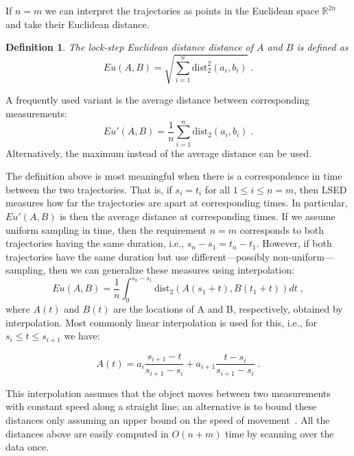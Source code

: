 \documentclass{interact}
\newcommand{\dist}{\ensuremath{\text{dist}}}
\newtheorem{definition}{Definition}
\begin{document}

If  $n=m$ we can interpret the trajectories as points in the Euclidean space $\mathbb{R}^{2n}$ and take their Euclidean distance.

\begin{definition}
The lock-step Euclidean distance distance of $A$ and $B$ is defined as
\[
Eu(A,B) = \sqrt {\sum_{i=1}^n \dist_2^2(a_i,b_i)}\;.
\]
\end{definition}

A frequently used variant is the average distance between corresponding measurements:
\begin{equation}
Eu'(A,B) = \frac{1}{n}\sum_{i=1}^n \dist_2(a_i,b_i)\;.
\end{equation}
Alternatively, the maximum instead of the average distance can be used.

The definition above is most meaningful when there is a correspondence in time between the two trajectories.
That is, if $s_i = t_i$ for all $1 \leq i \leq n=m$, then LSED measures how far the trajectories are apart at corresponding times. In particular, $Eu'(A,B)$ is then the average distance at corresponding times.
If we assume uniform sampling in time, then the requirement $n=m$ corresponds to both trajectories having the same duration, i.e., $s_n - s_1 = t_n - t_1$. However, if both trajectories have the same duration but use different---possibly non-uniform--- sampling, then we can generalize these measures using interpolation:
\begin{equation}
Eu(A,B) = \frac{1}{n}\int_0^{s_n-s_1} \dist_2(A(s_1+t),B(t_1+t)) dt\;,
\end{equation}
where $A(t)$ and $B(t)$ are the locations of A and B, respectively, obtained by interpolation. Most commonly linear interpolation is used for this, i.e., for $s_i \leq t \leq s_{i+1}$ we have:

\begin{equation}
\label{eq:interpolated_traj}
 A(t) = a_{i} \frac{s_{i+1}-t}{s_{i+1}-s_i}  + a_{i+1} \frac{t -s_i}{s_{i+1}-s_i}\;.
\end{equation}

This interpolation assumes that the  object moves between two measurements with constant speed along a straight line; an alternative is to bound these distances only assuming an upper bound on the speed of movement~\citep{DBLP:conf/gis/BuchinP13}. All the distances above are easily computed in $O(n+m)$ time by scanning over the data once.
\end{document}
